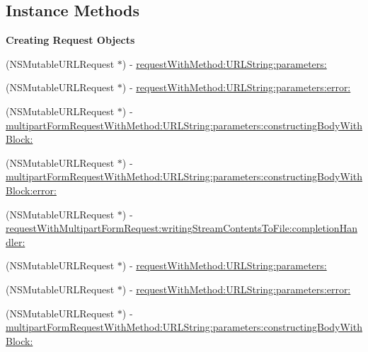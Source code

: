 \subsection*{Instance Methods}
\begin{Indent}\textbf{ Creating Request Objects}\par
{\em 

 

 }\begin{DoxyCompactItemize}
\item 
(N\+S\+Mutable\+U\+R\+L\+Request $\ast$) -\/ \mbox{\hyperlink{interface_a_f_h_t_t_p_request_serializer_a929788bfc0a6bfda0a686a019dae1803}{request\+With\+Method\+:\+U\+R\+L\+String\+:parameters\+:}}
\item 
(N\+S\+Mutable\+U\+R\+L\+Request $\ast$) -\/ \mbox{\hyperlink{interface_a_f_h_t_t_p_request_serializer_ac348d84d91a02fe1461b6ecf00129ef5}{request\+With\+Method\+:\+U\+R\+L\+String\+:parameters\+:error\+:}}
\item 
(N\+S\+Mutable\+U\+R\+L\+Request $\ast$) -\/ \mbox{\hyperlink{interface_a_f_h_t_t_p_request_serializer_a7fc28e3419037c411489c3aa16c754a0}{multipart\+Form\+Request\+With\+Method\+:\+U\+R\+L\+String\+:parameters\+:constructing\+Body\+With\+Block\+:}}
\item 
(N\+S\+Mutable\+U\+R\+L\+Request $\ast$) -\/ \mbox{\hyperlink{interface_a_f_h_t_t_p_request_serializer_a814033bcf329a601894a8b70991386d3}{multipart\+Form\+Request\+With\+Method\+:\+U\+R\+L\+String\+:parameters\+:constructing\+Body\+With\+Block\+:error\+:}}
\item 
(N\+S\+Mutable\+U\+R\+L\+Request $\ast$) -\/ \mbox{\hyperlink{interface_a_f_h_t_t_p_request_serializer_af7a636b437782ad5a93351fcefa5ce46}{request\+With\+Multipart\+Form\+Request\+:writing\+Stream\+Contents\+To\+File\+:completion\+Handler\+:}}
\item 
(N\+S\+Mutable\+U\+R\+L\+Request $\ast$) -\/ \mbox{\hyperlink{interface_a_f_h_t_t_p_request_serializer_a929788bfc0a6bfda0a686a019dae1803}{request\+With\+Method\+:\+U\+R\+L\+String\+:parameters\+:}}
\item 
(N\+S\+Mutable\+U\+R\+L\+Request $\ast$) -\/ \mbox{\hyperlink{interface_a_f_h_t_t_p_request_serializer_ac348d84d91a02fe1461b6ecf00129ef5}{request\+With\+Method\+:\+U\+R\+L\+String\+:parameters\+:error\+:}}
\item 
(N\+S\+Mutable\+U\+R\+L\+Request $\ast$) -\/ \mbox{\hyperlink{interface_a_f_h_t_t_p_request_serializer_a7fc28e3419037c411489c3aa16c754a0}{multipart\+Form\+Request\+With\+Method\+:\+U\+R\+L\+String\+:parameters\+:constructing\+Body\+With\+Block\+:}}

\end{DoxyCompactItemize}
\end{Indent}
